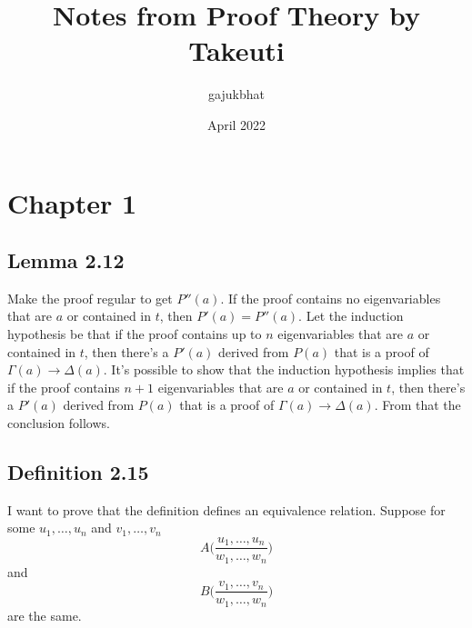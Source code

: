 \documentclass{article}
\title{Notes from Proof Theory by Takeuti}
\author{gajukbhat}
\date{April 2022}
\begin{document}
\maketitle

\section{Chapter 1}
\subsection{Lemma 2.12}
Make the proof regular to get \(P''(a)\). If the proof contains no eigenvariables that are \(a\) or contained in \(t\), then \(P'(a) = P''(a)\). 
Let the induction hypothesis be that if the proof contains up to \(n\) eigenvariables that are \(a\) or contained in \(t\), then there's a \(P'(a)\) derived from \(P(a)\) that is a proof of \(\Gamma(a) \rightarrow \Delta(a)\). It's possible to show that the induction hypothesis implies that if the proof contains \(n + 1\) eigenvariables that are \(a\) or contained in \(t\), then there's a \(P'(a)\) derived from \(P(a)\) that is a proof of \(\Gamma(a) \rightarrow \Delta(a)\).
From that the conclusion follows.

\subsection{Definition 2.15}
I want to prove that the definition defines an equivalence relation. Suppose for some \(u_1, \ldots, u_n\) and \(v_1, \ldots, v_n\)
\[
A\biggl(\frac{u_1, \ldots, u_n}{w_1, \ldots, w_n}\biggr)
\]
and
\[
B\biggl(\frac{v_1, \ldots, v_n}{w_1, \ldots, w_n}\biggr)
\]
are the same.
\end{document}
